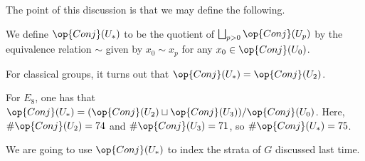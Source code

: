 \documentclass[../notes.tex]{subfiles}
\begin{document}
The point of this discussion is that we may define the following.
\begin{notation}
	We define $\op{Conj}(U_*)$ to be the quotient of $\bigsqcup_{p>0}\op{Conj}(U_p)$ by the equivalence relation $\sim$ given by $x_0\sim x_p$ for any $x_0\in\op{Conj}(U_0)$.
\end{notation}
\begin{example}
	For classical groups, it turns out that $\op{Conj}(U_*)=\op{Conj}(U_2)$.
\end{example}
\begin{example}
	For $E_8$, one has that $\op{Conj}(U_*)=(\op{Conj}(U_2)\sqcup\op{Conj}(U_3))/\op{Conj}(U_0)$. Here, $\#\op{Conj}(U_2)=74$ and $\#\op{Conj}(U_3)=71$, so $\#\op{Conj}(U_*)=75$.
\end{example}
We are going to use $\op{Conj}(U_*)$ to index the strata of $G$ discussed last time.
\end{document}

